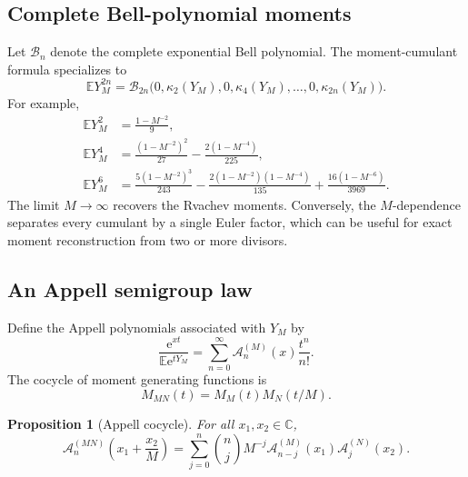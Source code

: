 \documentclass[11pt,oneside]{article}
\newtheorem{proposition}[theorem]{Proposition}
\theoremstyle{definition}
\theoremstyle{remark}
\newcommand{\C}{\mathbb C}
\newcommand{\e}{\mathrm e}
\numberwithin{equation}{section}
\newcommand{\Bell}{\mathcal B}
\newcommand{\1}{\mathbf 1}
\begin{document}
\subsection{Complete Bell-polynomial moments}

Let $\Bell_n$ denote the complete exponential Bell polynomial.  The moment-cumulant
formula specializes to
\begin{equation}
 \mathbb E Y_M^{2n}
 =\Bell_{2n}\bigl(0,\kappa_2(Y_M),0,\kappa_4(Y_M),\ldots,
 0,\kappa_{2n}(Y_M)\bigr).
 \label{eq:Bell-moments}
\end{equation}
For example,
\begin{align}
 \mathbb E Y_M^2
 &=\frac{1-M^{-2}}9,
 \label{eq:moment2}\\
 \mathbb E Y_M^4
 &=\frac{(1-M^{-2})^2}{27}
   -\frac{2(1-M^{-4})}{225},
 \label{eq:moment4}\\
 \mathbb E Y_M^6
 &=\frac{5(1-M^{-2})^3}{243}
   -\frac{2(1-M^{-2})(1-M^{-4})}{135}
   +\frac{16(1-M^{-6})}{3969}.
 \label{eq:moment6}
\end{align}
The limit $M\to\infty$ recovers the Rvachev moments.  Conversely, the $M$-dependence
separates every cumulant by a single Euler factor, which can be useful for exact moment
reconstruction from two or more divisors.

\subsection{An Appell semigroup law}

Define the Appell polynomials associated with $Y_M$ by
\begin{equation}
 \frac{\e^{xt}}{\mathbb E\e^{tY_M}}
 =\sum_{n=0}^{\infty}\mathscr A_n^{(M)}(x)\frac{t^n}{n!}.
 \label{eq:Appell-def}
\end{equation}
The cocycle of moment generating functions is
\begin{equation}
 M_{MN}(t)=M_M(t)M_N(t/M).
 \label{eq:mgf-cocycle}
\end{equation}

\begin{proposition}[Appell cocycle]
\label{prop:Appell-cocycle}
For all $x_1,x_2\in\C$,
\begin{equation}
 \mathscr A_n^{(MN)}\!\left(x_1+\frac{x_2}{M}\right)
 =\sum_{j=0}^{n}\binom nj M^{-j}
 \mathscr A_{n-j}^{(M)}(x_1)\mathscr A_j^{(N)}(x_2).
 \label{eq:Appell-cocycle}
\end{equation}
\end{proposition}
\end{document}
